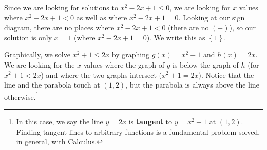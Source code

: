 \documentclass{ximera}
\begin{document}
\begin{example}
\begin{explanation}
\begin{enumerate}
\begin{center}
\begin{image}
\end{image}
\end{center}


Since we are looking for solutions to $x^2-2x+1 \leq 0$, we are looking for $x$ values where $x^2-2x+1 < 0$ as well as where $x^2-2x+1 = 0$.  Looking at our sign diagram, there are no places where $x^2-2x+1 < 0$ (there are no $(-)$), so our solution is only $x=1$ (where $x^2-2x+1 = 0$).  We write this as $\left\{1\right\}$.  

\medskip

Graphically, we solve $x^2+1 \leq 2x$ by graphing $g(x) = x^2+1$ and $h(x)=2x$. We are looking for the $x$ values where the graph of $g$ is below the graph of $h$ (for $x^2+1 < 2x$) and where the two graphs intersect ($x^2+1 = 2x$).  Notice that the line and the parabola touch at $\left(1, 2\right)$, but the parabola is always above the line otherwise.\footnote{In this case, we say the line $y=2x$ is \textbf{tangent} to $y=x^2+1$ at $\left(1, 2\right)$.  Finding tangent lines to arbitrary functions is a fundamental problem solved, in general, with Calculus.}



\end{enumerate}
\end{explanation}
\end{example}
\end{document}

